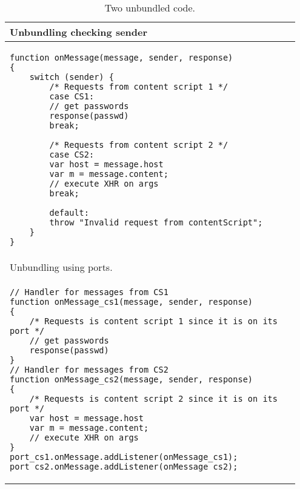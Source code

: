 \begin{table}[tlb]
\begin{small}
\begin{center}
\begin{tabular}{p{0.95\linewidth}}
Unbundling checking sender\\
\hline
\begin{lstlisting}
function onMessage(message, sender, response)
{    	
	switch (sender) {
		/* Requests from content script 1 */
		case CS1:
		// get passwords
		response(passwd)
		break;
		
		/* Requests from content script 2 */
		case CS2:
		var host = message.host
		var m = message.content;
		// execute XHR on args
		break;
				
		default:
		throw "Invalid request from contentScript";
	}
}
\end{lstlisting}\\
\hline
\hline
Unbundling using ports.\\
\hline
\begin{lstlisting}
// Handler for messages from CS1
function onMessage_cs1(message, sender, response)
{    	
	/* Requests is content script 1 since it is on its port */
	// get passwords
	response(passwd)
}
// Handler for messages from CS2
function onMessage_cs2(message, sender, response)
{    	
	/* Requests is content script 2 since it is on its port */
	var host = message.host
	var m = message.content;
	// execute XHR on args
}
port_cs1.onMessage.addListener(onMessage_cs1);
port_cs2.onMessage.addListener(onMessage_cs2);
\end{lstlisting}\\
\hline
\end{tabular}
\end{center}
\end{small}
\caption{Two unbundled code.}
\label{tab:UnBundled}
\end{table}


